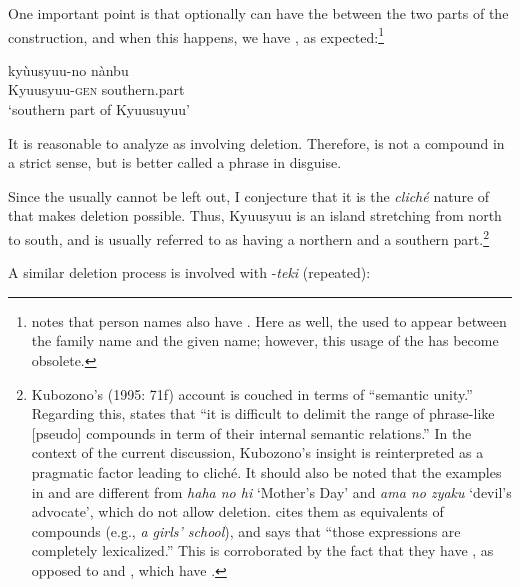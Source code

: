 \documentclass[output=paper]{LSP/langsci}
\begin{document}
One important point is that  optionally can have the  between the two parts of the construction, and when this happens, we have , as expected:\footnote{\citet[70]{Kubozono1995} notes that person names also have . Here as well, the   used to appear between the family name and the given name; however, this usage of the   has become obsolete.} 

\ea\label{ex:nishiyama:43}
\gll   kyùusyuu-no  nànbu\\
    Kyuusyuu-\textsc{gen} southern.part\\
\glt ‘southern part of Kyuusuyuu’
\z

It is reasonable to analyze  as involving  deletion. Therefore,  is not a compound in a strict sense, but is better called a phrase in disguise.

Since the  usually cannot be left out, I conjecture that it is the \textit{cliché} nature of  that makes  deletion possible. Thus, Kyuusyuu is an island stretching from north to south, and is usually referred to as having a northern and a southern part.\footnote{Kubozono’s (1995: 71f) account is couched in terms of “semantic unity.” Regarding this, \citet[261]{Kageyama2001} states that “it is difficult to delimit the range of phrase-like [pseudo] compounds in term of their internal semantic relations.” In the context of the current discussion, Kubozono’s insight is reinterpreted as a pragmatic factor leading to cliché.  It should also be noted that the examples in  and  are different from \textit{haha no hi} ‘Mother’s Day’ and \textit{ama no zyaku} ‘devil’s advocate’, which do not allow  deletion. \citet[268]{Kageyama2001} cites them as  equivalents of  compounds (e.g., \textit{a girls’ school}), and says that “those expressions are completely lexicalized.” This is corroborated by the fact that they have , as opposed to  and , which have .}

  A similar deletion process is involved with -\textit{teki} (repeated):
\end{document}
